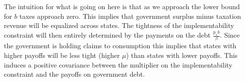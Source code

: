 \documentclass[12pt]{article}
\begin{document}
The intuition for what is going on here is that as we approach the lower bound for $b$ taxes approach zero.  This implies that government surplus minus taxation revenue will be equalized across states.  The tightness of the implementability constraint will then entirely determined by the payments on the debt $\frac{p_s b}{\beta}$.  Since the government is holding claims to consumption this implies that states with higher payoffs will be less tight (higher $\mu$) than states with lower payoffs.  This induces a positive covariance between the multiplier on the implementability constraint and the payoffs on government debt.
\end{document}
